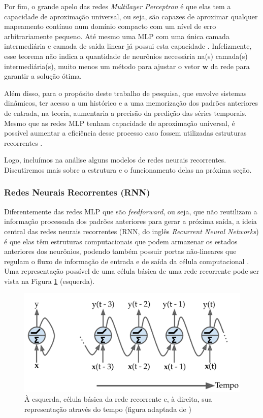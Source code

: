\documentclass[a4paper, 12pt]{article}
\begin{document}
Por fim, o grande apelo das redes \textit{Multilayer Perceptron} é que elas tem a capacidade de aproximação universal, ou seja, são capazes de aproximar qualquer mapeamento contí\-nuo num domínio compacto com um nível de erro arbitrariamente pequeno. Até mesmo uma MLP com uma única camada intermediária e camada de saída linear já possui esta capacidade \cite{cybenko1989approximation, hornik1989multilayer}. Infelizmente, esse teorema não indica a quantidade de neurônios necessária na(s) camada(s) intermediária(s), muito menos um método para ajustar o vetor $\mathbf{w}$ da rede para garantir a solução ótima.

Além disso, para o propósito deste trabalho de pesquisa, que envolve sistemas dinâmicos, ter acesso a um histórico e a uma memorização dos padrões anteriores de entrada, na teoria, aumentaria a precisão da predição das séries temporais. Mesmo que as redes MLP tenham capacidade de aproximação universal, é possível aumentar a eficiência desse processo caso fossem utilizadas estruturas recorrentes \cite{connor1994recurrent, boccato2013novas}.

Logo, incluímos na análise alguns modelos de redes neurais recorrentes. Discutiremos mais sobre a estrutura e o funcionamento delas na próxima seção.

\subsubsection{Redes Neurais Recorrentes (RNN)} 
Diferentemente das redes MLP que são \textit{feedforward}, ou seja, que não reutilizam a informação processada dos padrões anteriores para gerar a próxima saída, a ideia central das redes neurais recorrentes (RNN, do inglês \textit{Recurrent Neural Networks}) é que elas têm estruturas computacionais que podem armazenar os estados anteriores dos neurônios, podendo também possuir portas não-lineares que regulam o fluxo de informação de entrada e de saída da célula computacional \cite{haykin2010neural}. Uma representação possível de uma célula básica de uma rede recorrente pode ser vista na Figura \ref{fig:recorrente-cell} (esquerda).
\begin{figure}[H]
\centering
\includegraphics[scale = 0.2]{rnn-cell.pdf}
\caption{À esquerda, célula básica da rede recorrente e, à direita, sua representação através do tempo (figura adaptada de \cite{geron2019hands})}
\label{fig:recorrente-cell}
\end{figure}
\end{document}
